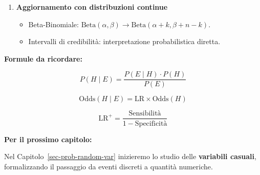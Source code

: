 \documentclass[
  italian,
  letterpaper,
  a4paper,
  11pt,
  open=any]{scrbook}
\providecommand{\tightlist}{%
  \setlength{\itemsep}{0pt}\setlength{\parskip}{0pt}}
\theoremstyle{plain}
\theoremstyle{definition}
\theoremstyle{definition}
\theoremstyle{remark}
\begin{document}
\begin{tcolorbox}
\begin{enumerate}
  \begin{itemize}
  \tightlist
  \item
    Ignorare la prevalenza porta a sovrastimare il VPP.
  \item
    Lo stesso test ha significati diversi in contesti diversi.
  \item
    Il teorema di Bayes costringe a considerare il contesto.
  \end{itemize}
\item
  \textbf{Aggiornamento con distribuzioni continue}

  \begin{itemize}
  \tightlist
  \item
    Beta-Binomiale:
    \(\text{Beta}(\alpha, \beta) \to \text{Beta}(\alpha+k, \beta+n-k)\).
  \item
    Intervalli di credibilità: interpretazione probabilistica diretta.
  \end{itemize}
\end{enumerate}

\textbf{Formule da ricordare:}

\[P(H \mid E) = \frac{P(E \mid H) \cdot P(H)}{P(E)}\]

\[\text{Odds}(H \mid E) = \text{LR} \times \text{Odds}(H)\]

\[\text{LR}^+ = \frac{\text{Sensibilità}}{1 - \text{Specificità}}\]

\textbf{Per il prossimo capitolo:}

Nel Capitolo~\ref{sec-prob-random-var} inizieremo lo studio delle
\textbf{variabili casuali}, formalizzando il passaggio da eventi
discreti a quantità numeriche.

\end{tcolorbox}
\end{document}
